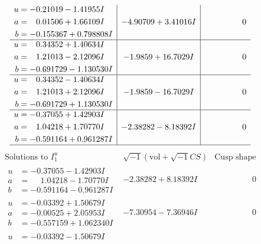 \documentclass[1p]{elsarticle_modified}
\theoremstyle{definition}
\newcommand{\I}{\sqrt{-1}}
\begin{document}
$$\begin{array}{c|c|c}
\begin{aligned}
u &= -0.21019 - 1.41955 I \\
a &= \phantom{-}0.01506 + 1.66109 I \\
b &= -0.155367 + 0.798808 I\end{aligned}
 & -4.90709 + 3.41016 I & \phantom{-0.000000 } 0 \\ \hline\begin{aligned}
u &= \phantom{-}0.34352 + 1.40634 I \\
a &= \phantom{-}1.21013 - 2.12096 I \\
b &= -0.691729 - 1.130530 I\end{aligned}
 & -1.9859 + 16.7029 I & \phantom{-0.000000 } 0 \\ \hline\begin{aligned}
u &= \phantom{-}0.34352 - 1.40634 I \\
a &= \phantom{-}1.21013 + 2.12096 I \\
b &= -0.691729 + 1.130530 I\end{aligned}
 & -1.9859 - 16.7029 I & \phantom{-0.000000 } 0 \\ \hline\begin{aligned}
u &= -0.37055 + 1.42903 I \\
a &= \phantom{-}1.04218 + 1.70770 I \\
b &= -0.591164 + 0.961287 I\end{aligned}
 & -2.38282 - 8.18392 I & \phantom{-0.000000 } 0\\
 \hline 
 \end{array}$$\newpage$$\begin{array}{c|c|c}  
\text{Solutions to }I^u_{1}& \I (\text{vol} + \sqrt{-1}CS) & \text{Cusp shape}\\
 \hline 
\begin{aligned}
u &= -0.37055 - 1.42903 I \\
a &= \phantom{-}1.04218 - 1.70770 I \\
b &= -0.591164 - 0.961287 I\end{aligned}
 & -2.38282 + 8.18392 I & \phantom{-0.000000 } 0 \\ \hline\begin{aligned}
u &= -0.03392 + 1.50679 I \\
a &= -0.00525 + 2.05953 I \\
b &= -0.557159 + 1.062340 I\end{aligned}
 & -7.30954 - 7.36946 I & \phantom{-0.000000 } 0 \\ \hline\begin{aligned}
u &= -0.03392 - 1.50679 I \\

\end{aligned}
\end{array}$$
\end{document}
